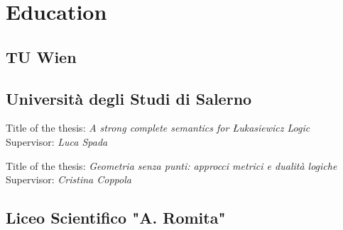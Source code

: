 \documentclass[letterpaper]{deedy-resume} %
\begin{document}
\begin{minipage}[t]{0.33\textwidth} %


\section{Education} 

\subsection{TU Wien}


\sectionspace

\subsection{Università degli Studi di Salerno}

Title of the thesis: \emph{A strong complete semantics for {\L}ukasiewicz Logic}\\
Supervisor: \emph{Luca Spada}
\sectionspace %

Title of the thesis: \emph{Geometria senza punti: approcci metrici e dualità logiche}
Supervisor: \emph{Cristina Coppola}
\sectionspace %


\subsection{Liceo Scientifico "A. Romita"}


\sectionspace %



\end{minipage}
\end{document}
